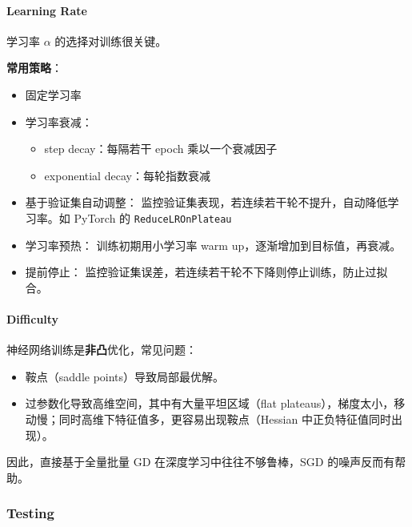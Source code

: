 \paragraph{Learning Rate}\label{learning-rate}

学习率 \(\alpha\) 的选择对训练很关键。

\textbf{常用策略}：

\begin{itemize}
  \tightlist
  \item
        固定学习率
  \item
        学习率衰减：

        \begin{itemize}
          \tightlist
          \item
                step decay：每隔若干 epoch 乘以一个衰减因子
          \item
                exponential decay：每轮指数衰减
        \end{itemize}
  \item
        基于验证集自动调整：
        监控验证集表现，若连续若干轮不提升，自动降低学习率。如 PyTorch 的
        \texttt{ReduceLROnPlateau}
  \item
        学习率预热： 训练初期用小学习率 warm up，逐渐增加到目标值，再衰减。
  \item
        提前停止： 监控验证集误差，若连续若干轮不下降则停止训练，防止过拟合。
\end{itemize}

\paragraph{Difficulty}\label{difficulty}

神经网络训练是\textbf{非凸}优化，常见问题：

\begin{itemize}
  \tightlist
  \item
        鞍点（saddle points）导致局部最优解。
  \item
        过参数化导致高维空间，其中有大量平坦区域（flat
        plateaus），梯度太小，移动慢；同时高维下特征值多，更容易出现鞍点（Hessian
        中正负特征值同时出现）。
\end{itemize}

因此，直接基于全量批量 GD 在深度学习中往往不够鲁棒，SGD
的噪声反而有帮助。

\subsubsection{Testing}\label{testing}


